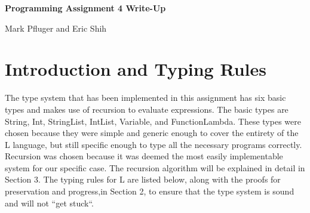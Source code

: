 \documentclass{article}
\begin{document}
\begin{center}
{\bf Programming Assignment 4 Write-Up}

Mark Pfluger and Eric Shih
\end{center}

\section{Introduction and Typing Rules}\*
   The type system that has been implemented in this assignment has six basic types and makes use of
recursion to evaluate expressions. The basic types are String, Int, StringList, IntList, Variable,
and FunctionLambda. These types were chosen because they were simple and generic enough to cover the
entirety of the L language, but still specific enough to type all the necessary programs correctly. 
Recursion was chosen because it was deemed the most easily implementable system for our specific case. 
The recursion algorithm will be explained in detail in Section 3. The typing rules for L are listed below,
along with the proofs for preservation and progress,in Section 2, to ensure that the type system is sound 
and will not ``get stuck``.\\
\end{document}
